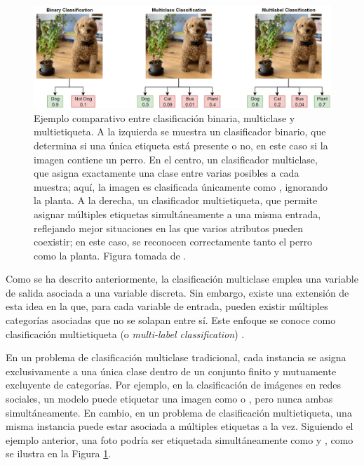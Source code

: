 \begin{figure}[htb]
    \includegraphics[width=\linewidth]{figures/2_theory/multilabel_example.png}
    \caption[Ejemplo comparativo entre clasificación binaria, multiclase y multietiqueta]{Ejemplo comparativo entre clasificación binaria, multiclase y multietiqueta. A la izquierda se muestra un clasificador binario, que determina si una única etiqueta está presente o no, en este caso si la imagen contiene un perro. En el centro, un clasificador multiclase, que asigna exactamente una clase entre varias posibles a cada muestra; aquí, la imagen es clasificada únicamente como , ignorando la planta. A la derecha, un clasificador multietiqueta, que permite asignar múltiples etiquetas simultáneamente a una misma entrada, reflejando mejor situaciones en las que varios atributos pueden coexistir; en este caso, se reconocen correctamente tanto el perro como la planta. Figura tomada de \cite{noauthor_multilabel_nodate}.}
    \label{multilabel_example}
\end{figure}

Como se ha descrito anteriormente, la clasificación multiclase emplea una variable de salida asociada a una variable discreta. Sin embargo, existe una extensión de esta idea en la que, para cada variable de entrada, pueden existir múltiples categorías asociadas que no se solapan entre sí. Este enfoque se conoce como clasificación multietiqueta (o \textit{multi-label classification}) \cite{tarekegn_deep_2024}.

En un problema de clasificación multiclase tradicional, cada instancia se asigna exclusivamente a una única clase dentro de un conjunto finito y mutuamente excluyente de categorías. Por ejemplo, en la clasificación de imágenes en redes sociales, un modelo puede etiquetar una imagen como  o , pero nunca ambas simultáneamente. En cambio, en un problema de clasificación multietiqueta, una misma instancia puede estar asociada a múltiples etiquetas a la vez. Siguiendo el ejemplo anterior, una foto podría ser etiquetada simultáneamente como  y , como se ilustra en la Figura \ref{multilabel_example}.

